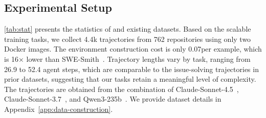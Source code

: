 \documentclass{article}
\theoremstyle{plain}
\theoremstyle{definition}
\theoremstyle{remark}
\begin{document}
\subsection{Experimental Setup}
\autoref{tab:stat} presents the statistics of \methodName and existing datasets. 
Based on the scalable training tasks, we collect 4.4k trajectories from 762 repositories using only two Docker images.
The environment construction cost is only 0.07\textcent per example, which is 16× lower than SWE-Smith~\cite{swe-smith}.
Trajectory lengths vary by task, ranging from 26.9 to 52.4 agent steps, which are comparable to the issue-solving trajectories in prior datasets, suggesting that our tasks retain a meaningful level of complexity.
The trajectories are obtained from the combination of Claude-Sonnet-4.5~\cite{claude45}, Claude-Sonnet-3.7~\cite{claude37}, and Qwen3-235b~\cite{qwen3}.
We provide dataset details in Appendix~\ref{app:data-construction}.
\end{document}

